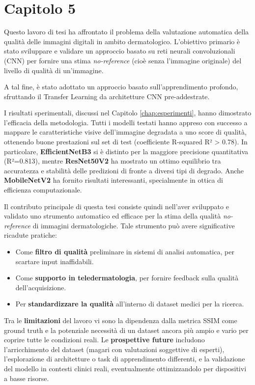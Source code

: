 %
%
\chapter{Capitolo 5}
\label{chap:conclusioni}

Questo lavoro di tesi ha affrontato il problema della valutazione automatica della qualità delle immagini digitali in ambito dermatologico. L'obiettivo primario è stato sviluppare e validare un approccio basato su reti neurali convoluzionali (CNN) per fornire una stima \textit{no-reference} (cioè senza l'immagine originale) del livello di qualità di un'immagine.

A tal fine, è stato adottato un approccio basato sull'apprendimento profondo, sfruttando il Transfer Learning da architetture CNN pre-addestrate.

I risultati sperimentali, discussi nel Capitolo \ref{chap:esperimenti}, hanno dimostrato l'efficacia della metodologia. Tutti i modelli testati hanno appreso con successo a mappare le caratteristiche visive dell'immagine degradata a uno score di qualità, ottenendo buone prestazioni sul set di test (coefficiente R-squared R² > 0.78). In particolare, \textbf{EfficientNetB3} si è distinto per la maggiore precisione quantitativa (R²=0.813), mentre \textbf{ResNet50V2} ha mostrato un ottimo equilibrio tra accuratezza e stabilità delle predizioni di fronte a diversi tipi di degrado. Anche \textbf{MobileNetV2} ha fornito risultati interessanti, specialmente in ottica di efficienza computazionale.

Il contributo principale di questa tesi consiste quindi nell'aver sviluppato e validato uno strumento automatico ed efficace per la stima della qualità \textit{no-reference} di immagini dermatologiche. Tale strumento può avere significative ricadute pratiche:
\begin{itemize}
    \item Come \textbf{filtro di qualità} preliminare in sistemi di analisi automatica, per scartare input inaffidabili.
    \item Come \textbf{supporto in teledermatologia}, per fornire feedback sulla qualità dell'acquisizione.
    \item Per \textbf{standardizzare la qualità} all'interno di dataset medici per la ricerca.
\end{itemize}

Tra le \textbf{limitazioni} del lavoro vi sono la dipendenza dalla metrica SSIM come ground truth e la potenziale necessità di un dataset ancora più ampio e vario per coprire tutte le condizioni reali. Le \textbf{prospettive future} includono l'arricchimento del dataset (magari con valutazioni soggettive di esperti), l'esplorazione di architetture o task di apprendimento differenti, e la validazione del modello in contesti clinici reali, eventualmente ottimizzandolo per dispositivi a basse risorse.

